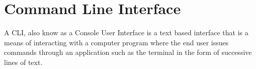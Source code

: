 \newpage
\chapter*{Command Line Interface}

A \gls{CLI}, also know as a Console User Interface is a text based interface that is a means of interacting with a computer program where the end user issues commands through an application such as the terminal in the form of successive lines of text. 